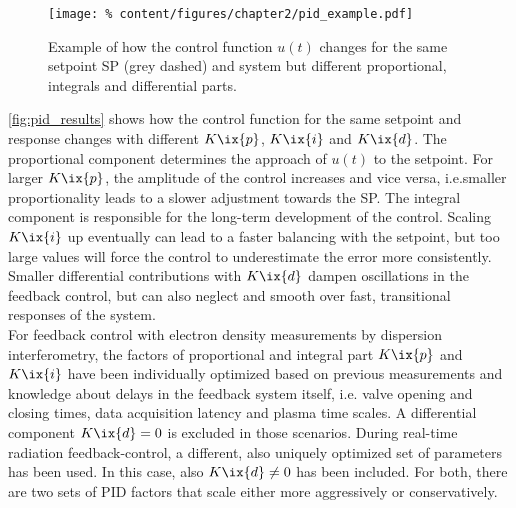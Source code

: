 %
                \begin{figure}[t]%
                    \centering%
                    \texttt{[image: \%
                        content/figures/chapter2/pid\_example.pdf]}%
                    \caption{Example of how the control function $u\left(t\right)$ changes for the same setpoint SP (grey dashed) and system but different proportional, integrals and differential parts.}\label{fig:pid_results}%
                \end{figure}%
%
                \autoref{fig:pid_results} shows how the control function for the same setpoint and response changes with different $K\ix{p}$, $K\ix{i}$ and $K\ix{d}$. The proportional component determines the approach of $u\left(t\right)$ to the setpoint. For larger $K\ix{p}$, the amplitude of the control increases and vice versa, i.e.smaller proportionality leads to a slower adjustment towards the SP. The integral component is responsible for the long-term development of the control. Scaling $K\ix{i}$ up eventually can lead to a faster balancing with the setpoint, but too large values will force the control to underestimate the error more consistently. Smaller differential contributions with $K\ix{d}$ dampen oscillations in the feedback control, but can also neglect and smooth over fast, transitional responses of the system.\\%
                For feedback control with electron density measurements by dispersion interferometry, the factors of proportional and integral part $K\ix{p}$ and $K\ix{i}$ have been individually optimized based on previous measurements and knowledge about delays in the feedback system itself, i.e. valve opening and closing times, data acquisition latency and plasma time scales. A differential component $K\ix{d}=0$ is excluded in those scenarios. During real-time radiation feedback-control, a different, also uniquely optimized set of parameters has been used. In this case, also $K\ix{d}\neq 0$ has been included. For both, there are two sets of PID factors that scale either more aggressively or conservatively.%
%
